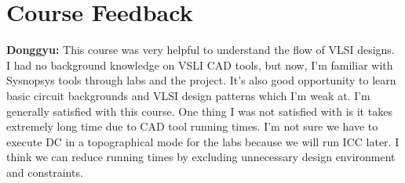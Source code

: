 \section*{Course Feedback}
\textbf{Donggyu:} This course was very helpful to understand the flow of VLSI designs. I had no background knowledge on VSLI CAD tools, but now, I'm familiar with Sysnopsys tools through labs and the project. It's also good opportunity to learn basic circuit backgrounds and VLSI design patterns which I'm weak at. I'm generally satisfied with this course. One thing I was not satisfied with is it takes extremely long time due to CAD tool running times. I'm not sure we have to execute DC in a topographical mode for the labs because we will run ICC later. I think we can reduce running times by excluding unnecessary design environment and constraints.